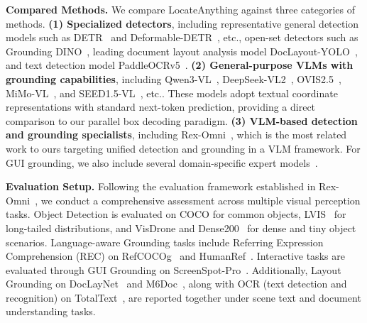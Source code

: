 \documentclass{llmxive}
\providecommand{\etc}{etc.\xspace}
\begin{document}
\vspace{+1mm}
\noindent\textbf{Compared Methods.} We compare LocateAnything against three categories of methods. \textbf{(1) Specialized detectors}, including representative general detection models such as DETR~\citep{carion2020end} and Deformable-DETR~\citep{zhu2021deformabledetrdeformabletransformers}, \etc, open-set detectors such as Grounding DINO~\citep{liu2023grounding}, leading document layout analysis model DocLayout-YOLO~\citep{zhao2024doclayout}, and text detection model PaddleOCRv5~\citep{cui2025paddleocr}. \textbf{(2) General-purpose VLMs with grounding capabilities}, including Qwen3-VL~\citep{bai2025qwen3vltechnicalreport}, DeepSeek-VL2~\citep{wu2024deepseekvl2mixtureofexpertsvisionlanguagemodels}, OVIS2.5~\citep{lu2025ovis25technicalreport}, MiMo-VL~\citep{coreteam2025mimovltechnicalreport}, and SEED1.5-VL~\citep{guo2025seed15vltechnicalreport}, \etc. These models adopt textual coordinate representations with standard next-token prediction, providing a direct comparison to our parallel box decoding paradigm. \textbf{(3) VLM-based detection and grounding specialists}, including Rex-Omni~\citep{jiang2025rexomni}, which is the most related work to ours targeting unified detection and grounding in a VLM framework. For GUI grounding, we also include several domain-specific expert models~\citep{liu_infigui-r1_2025, xie_scaling_2025, liu2025scalecua,yang_gta1_2025, ye_mobile-agent-v3_2025, zhou_mai-ui_2025, team_ui-venus-15_2026}.

\vspace{+1mm}
\noindent\textbf{Evaluation Setup.} Following the evaluation framework established in Rex-Omni~\citep{jiang2025rexomni}, we conduct a comprehensive assessment across multiple visual perception tasks.
Object Detection is evaluated on COCO for common objects, LVIS~\citep{gupta2019lvis} for long-tailed distributions, and VisDrone \citep{du2019visdrone} and Dense200~\citep{jiang2025rexomni} for dense and tiny object scenarios. Language-aware Grounding tasks include Referring Expression Comprehension (REC) on RefCOCOg~\citep{kazemzadeh-etal-2014-referitgame} and HumanRef~\citep{jiang2025referring}. Interactive tasks are evaluated through GUI Grounding on ScreenSpot-Pro~\citep{li2025screenspot}. Additionally, Layout Grounding on DocLayNet~\citep{pfitzmann2022doclaynet} and M6Doc~\citep{cheng2023m6doc}, along with OCR (text detection and recognition) on TotalText~\citep{ch2017total}, are reported together under scene text and document understanding tasks. 
\end{document}
